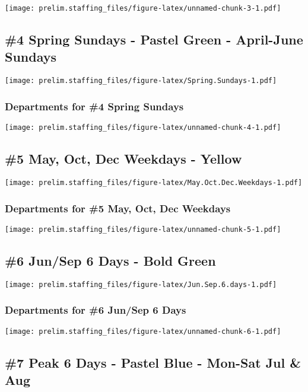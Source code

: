 \documentclass[]{article}
\begin{document}
\texttt{[image: prelim.staffing\_files/figure-latex/unnamed-chunk-3-1.pdf]}

\subsection{\#4 Spring Sundays - Pastel Green - April-June
Sundays}\label{spring-sundays---pastel-green---april-june-sundays}

\texttt{[image: prelim.staffing\_files/figure-latex/Spring.Sundays-1.pdf]}

\subsubsection{Departments for \#4 Spring
Sundays}\label{departments-for-4-spring-sundays}

\texttt{[image: prelim.staffing\_files/figure-latex/unnamed-chunk-4-1.pdf]}

\subsection{\#5 May, Oct, Dec Weekdays -
Yellow}\label{may-oct-dec-weekdays---yellow}

\texttt{[image: prelim.staffing\_files/figure-latex/May.Oct.Dec.Weekdays-1.pdf]}

\subsubsection{Departments for \#5 May, Oct, Dec
Weekdays}\label{departments-for-5-may-oct-dec-weekdays}

\texttt{[image: prelim.staffing\_files/figure-latex/unnamed-chunk-5-1.pdf]}

\subsection{\#6 Jun/Sep 6 Days - Bold
Green}\label{junsep-6-days---bold-green}

\texttt{[image: prelim.staffing\_files/figure-latex/Jun.Sep.6.days-1.pdf]}

\subsubsection{Departments for \#6 Jun/Sep 6
Days}\label{departments-for-6-junsep-6-days}

\texttt{[image: prelim.staffing\_files/figure-latex/unnamed-chunk-6-1.pdf]}

\subsection{\#7 Peak 6 Days - Pastel Blue - Mon-Sat Jul \&
Aug}\label{peak-6-days---pastel-blue---mon-sat-jul-aug}
\end{document}
